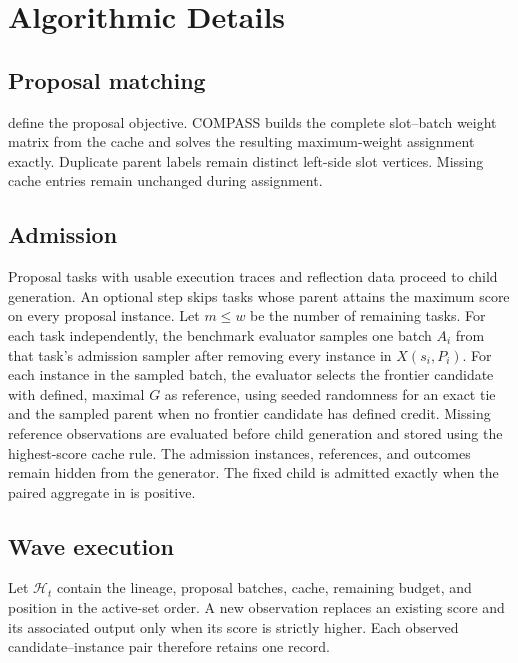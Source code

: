 \section{Algorithmic Details}
\label{app:algorithm}

\subsection{Proposal matching}

 define the
proposal objective.  COMPASS builds the complete slot--batch
weight matrix from the cache and solves the resulting
maximum-weight assignment exactly.  Duplicate parent labels remain distinct
left-side slot vertices.  Missing cache entries remain unchanged during assignment.

\subsection{Admission}

Proposal tasks with usable execution traces and reflection data proceed to child
generation.  An optional step skips tasks whose parent attains the maximum
score on every proposal instance.  Let $m\le w$ be the
number of remaining tasks.  For each task independently, the benchmark evaluator
samples one batch $A_i$ from that task's admission sampler after removing every
instance in $X(s_i,P_i)$.  For each instance in the sampled batch, the evaluator
selects the frontier candidate with defined, maximal
$G$ as reference, using seeded randomness for an exact tie and the sampled
parent when no frontier candidate has defined credit.  Missing reference
observations are evaluated before child generation and stored using the
highest-score cache rule.  The admission instances, references, and outcomes
remain hidden from the generator.  The fixed child is admitted exactly when the
paired aggregate in  is positive.

\subsection{Wave execution}

Let $\mathcal H_t$ contain the lineage, proposal batches, cache,
remaining budget, and position in the active-set order.  A new observation replaces an
existing score and its associated output only when its score is strictly higher.
Each observed candidate--instance pair therefore retains one record.

